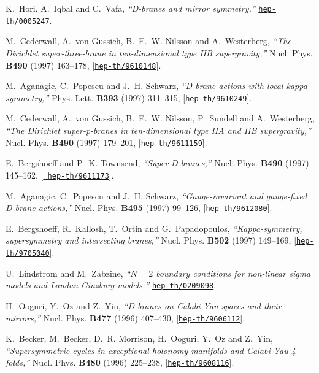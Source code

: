 \documentclass[a4paper,12pt]{article}
\numberwithin{equation}{section}
\begin{document}
\begin{thebibliography}{10}
K.~Hori, A.~Iqbal and C.~Vafa, {\it ``{D}-branes and mirror symmetry,''}
  \href{http://arXiv.org/abs/hep-th/0005247}{{\tt hep-th/0005247}}.

M.~Cederwall, A.~von Gussich, B.~E.~W. Nilsson and A.~Westerberg, {\it ``The
  {D}irichlet super-three-brane in ten-dimensional type {IIB} supergravity,''}
  Nucl. Phys. {\bf B490} (1997) 163--178,
  [\href{http://arXiv.org/abs/hep-th/9610148}{{\tt hep-th/9610148}}].

M.~Aganagic, C.~Popescu and J.~H. Schwarz, {\it ``{D}-brane actions with local
  kappa symmetry,''}  Phys. Lett. {\bf B393} (1997) 311--315,
  [\href{http://arXiv.org/abs/hep-th/9610249}{{\tt hep-th/9610249}}].

M.~Cederwall, A.~von Gussich, B.~E.~W. Nilsson, P.~Sundell and A.~Westerberg,
  {\it ``The {D}irichlet super-p-branes in ten-dimensional type {IIA} and {IIB}
  supergravity,''}  Nucl. Phys. {\bf B490} (1997) 179--201,
  [\href{http://arXiv.org/abs/hep-th/9611159}{{\tt hep-th/9611159}}].

E.~Bergshoeff and P.~K. Townsend, {\it ``Super {D}-branes,''}  Nucl. Phys. {\bf
  B490} (1997) 145--162, [\href{http://arXiv.org/abs/hep-th/9611173}{{\tt
  hep-th/9611173}}].

M.~Aganagic, C.~Popescu and J.~H. Schwarz, {\it ``Gauge-invariant and
  gauge-fixed {D}-brane actions,''}  Nucl. Phys. {\bf B495} (1997) 99--126,
  [\href{http://arXiv.org/abs/hep-th/9612080}{{\tt hep-th/9612080}}].

E.~Bergshoeff, R.~Kallosh, T.~Ortin and G.~Papadopoulos, {\it ``Kappa-symmetry,
  supersymmetry and intersecting branes,''}  Nucl. Phys. {\bf B502} (1997)
  149--169, [\href{http://arXiv.org/abs/hep-th/9705040}{{\tt hep-th/9705040}}].

U.~Lindstrom and M.~Zabzine, {\it ``{$N = 2$} boundary conditions for
  non-linear sigma models and {L}andau-{G}inzburg models,''}
  \href{http://arXiv.org/abs/hep-th/0209098}{{\tt hep-th/0209098}}.

H.~Ooguri, Y.~Oz and Z.~Yin, {\it ``{D}-branes on {C}alabi-{Y}au spaces and
  their mirrors,''}  Nucl. Phys. {\bf B477} (1996) 407--430,
  [\href{http://arXiv.org/abs/hep-th/9606112}{{\tt hep-th/9606112}}].

K.~Becker, M.~Becker, D.~R. Morrison, H.~Ooguri, Y.~Oz and Z.~Yin, {\it
  ``Supersymmetric cycles in exceptional holonomy manifolds and {C}alabi-{Y}au
  4-folds,''}  Nucl. Phys. {\bf B480} (1996) 225--238,
  [\href{http://arXiv.org/abs/hep-th/9608116}{{\tt hep-th/9608116}}].


\end{thebibliography}
\end{document}
